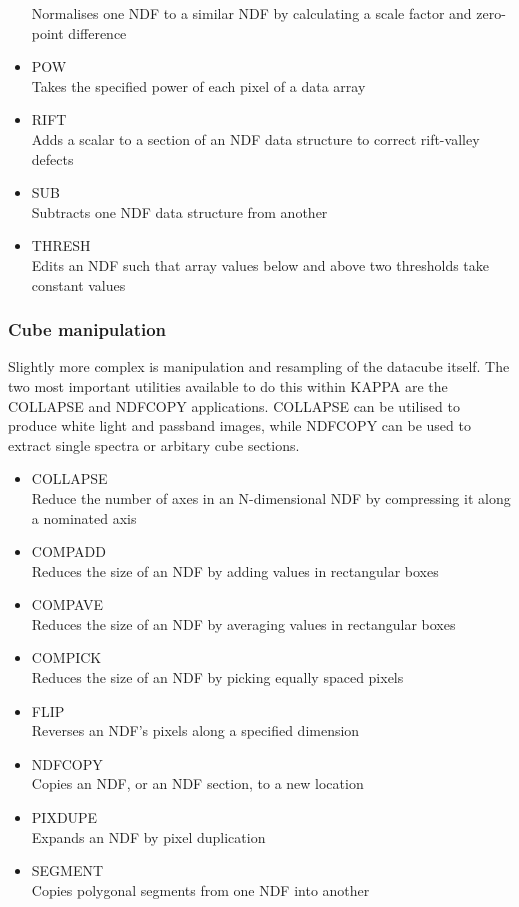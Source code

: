 \documentclass[twoside,11pt]{article}
\newcommand{\htmlref}[2]{#1}
\newcommand{\xref}[3]{#1}
\begin{document}
\begin{itemize}
Normalises one NDF to a similar NDF by calculating a scale factor and zero-point difference 
\item{\xref{POW}{sun95}{POW}}\\ 
Takes the specified power of each pixel of a data array 
\item{\xref{RIFT}{sun95}{RIFT}}\\ 
Adds a scalar to a section of an NDF data structure to correct rift-valley defects 
\item{\xref{SUB}{sun95}{SUB}}\\
Subtracts one NDF data structure from another 
\item{\xref{THRESH}{sun95}{THRESH}}\\ 
Edits an NDF such that array values below and above two thresholds take constant values 
\end{itemize}

\subsubsection{Cube manipulation}

Slightly more complex is manipulation and resampling of the datacube itself. The two most important utilities available to do this within KAPPA are the \xref{COLLAPSE}{sun95}{COLLAPSE} and \xref{NDFCOPY}{sun95}{NDFCOPY} applications. COLLAPSE can be utilised to produce \htmlref{white light and passband}{sc16_vis} images, while NDFCOPY can be used to extract single spectra or \htmlref{arbitary cube sections}{sc_16}.

\begin{itemize}
\item{\xref{COLLAPSE}{sun95}{COLLAPSE}}\\
Reduce the number of axes in an N-dimensional NDF by compressing it along a nominated axis 
\item{\xref{COMPADD}{sun95}{COMPADD}}\\
Reduces the size of an NDF by adding values in rectangular boxes 
\item{\xref{COMPAVE}{sun95}{COMPAVE}}\\
Reduces the size of an NDF by averaging values in rectangular boxes 
\item{\xref{COMPICK}{sun95}{COMPICK}}\\
Reduces the size of an NDF by picking equally spaced pixels 
\item{\xref{FLIP}{sun95}{FLIP}}\\
Reverses an NDF's pixels along a specified dimension 
\item{\xref{NDFCOPY}{sun95}{NDFCOPY}}\\
Copies an NDF, or an NDF section, to a new location 
\item{\xref{PIXDUPE}{sun95}{PIXDUPE}}\\
Expands an NDF by pixel duplication 
\item{\xref{SEGMENT}{sun95}{SEGMENT}}\\
Copies polygonal segments from one NDF into another 
\end{itemize}
\end{document}
